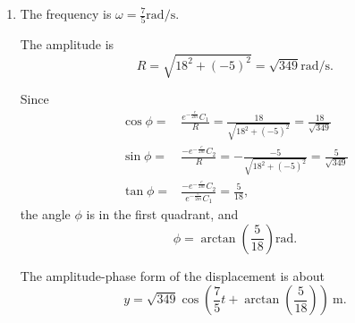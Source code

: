 \begin{solution}
\begin{enumerate}
\item The frequency is $\omega=\frac{7}{5} \si{\radian\per\second}$.

The amplitude is
\[R=\sqrt{18^2+(-5)^2}=\sqrt{349} \si{\radian\per\second}.\]

Since 
\[
\begin{aligned}
  \cos\phi=&\frac{e^{-\frac{c}{2m}}C_1}{R}=\frac{18}{\sqrt{18^2+(-5)^2}}=\frac{18}{\sqrt{349}}\\
  \sin\phi=&\frac{-e^{-\frac{c}{2m}}C_2}{R}=-\frac{-5}{\sqrt{18^2+(-5)^2}}=\frac{5}{\sqrt{349}}\\
  \tan\phi=&\frac{-e^{-\frac{c}{2m}}C_2}{e^{-\frac{c}{2m}}C_1}=\frac{5}{18},
\end{aligned}  
\]
the angle $\phi$ is in the first quadrant, and 
\[\phi= \arctan\left(\frac{5}{18}\right) \si{\radian}.\]

The amplitude-phase form of the displacement is about
\[y=\sqrt{349}\cos\left(\frac75t + \arctan\left(\frac{5}{18}\right)\right)~\si{\meter}.\]
\end{enumerate}
\end{solution}

